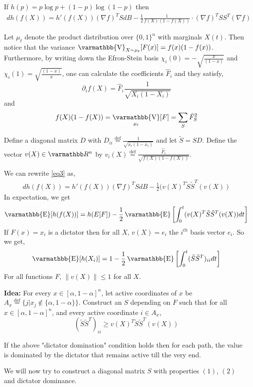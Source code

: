 \documentclass
[12pt,letterpaper]
{article}
\theoremstyle{definition}
\theoremstyle{remark}
\let\mathbb\varmathbb
\newcommand{\norm}[1]{\lVert#1\rVert}
\newcommand{\Esymb}{\mathbb{E}}
\newcommand{\Vsymb}{\mathbb{V}}
\DeclareMathOperator*{\E}{\Esymb}
\DeclareMathOperator*{\Var}{\Vsymb}
\newcommand{\defeq}{\stackrel{\mathrm{def}}=}
\newcommand{\R}{\mathbb R}
\renewcommand{\leq}{\leqslant}
\renewcommand{\geq}{\geqslant}
\numberwithin{equation}{section}
\begin{document}
If $h(p) = p \log p + (1-p) \log (1-p)$ then
\begin{align} \label{eq3}
	d h(f(X)) = h'(f(X)) (\nabla f)^T S dB - \frac{1}{2} \frac{1}{f(X)(1-f(X))} \cdot (\nabla f)^T S S^T (\nabla f)
\end{align}

Let $\mu_t$ denote the product distribution over $\{0,1\}^n$ with marginals $X(t)$.  Then notice that the variance $\Var_{X \sim \mu_t} [F(x)] = f(x)(1-f(x))$.  Furthermore, by writing down the Efron-Stein basis $\chi_i(0) = -\sqrt{\frac{x}{(1-x)}}$ and $\chi_i(1) = \sqrt{\frac{(1-x)}{x}}$, one can calculate the coefficients $\hat{F}_i$ and they satisfy,
\[ \partial_i f(X) = \hat{F}_i \frac{1}{\sqrt{X_i(1-X_i)}}\]
and 
\[f(X)(1-f(X)) = \Var_{\mu_t}[F] = \sum_S \hat{F}_S^2 \]

Define a diagonal matrix $D$ with $D_{ii} \defeq \frac{1}{\sqrt{x_i(1-x_i)}}$ and let  $\tilde{S} = SD$.
Define the vector $v(X) \in \R^n$ by $v_i(X) \defeq \frac{\hat{F}_i}{\sqrt{f(X)(1-f(X))}}$.  

We can rewrite \eqref{eq3} as,
\begin{align} \label{eq4}
	d h(f(X)) = h'(f(X)) (\nabla f)^T S dB - \frac{1}{2} (v(X)^T \tilde{S} \tilde{S}^T (v(X))
\end{align}
In expectation, we get 
\begin{align} \label{eq5}
	\E[h(f(X))] = h(E[F]) - \frac{1}{2} \E \left[ \int_0^t  (v(X)^T \tilde{S} \tilde{S}^T (v(X)) dt\right]
\end{align}
If $F(x) = x_i$ is a dictator then for all $X$, $v(X) = e_i$ the $i^{th}$ basis vector $e_i$.  So we get,
\begin{align}
	\E[h(X_i)] = 1 - \frac{1}{2} \E \left[ \int_0^t  (\tilde{S}\tilde{S}^T)_{ii} dt \right]
\end{align}
For all functions $F$, $\norm{v(X)} \leq 1$ for all $X$.


\noindent \textbf{Idea:}  For every $x \in [\alpha,1-\alpha]^n$, let active coordinates of $x$ be $A_x \defeq \{j | x_j \notin \{\alpha,1-\alpha\}\}$.  Construct an $S$ depending on $F$ such that for all $x \in [\alpha,1-\alpha]^n$, and every active coordinate $i \in A_x$,
 \[ (\tilde{S}\tilde{S}^T)_{ii} \geq v(X)^T \tilde{S} \tilde{S}^T (v(X)) \]

If the above "dictator domination" condition holds then for each path, the value is dominated by the dictator that remains active till the very end.

We will now try to construct a diagonal matrix $S$ with properties $(1)$, $(2)$ and dictator dominance.
\end{document}
